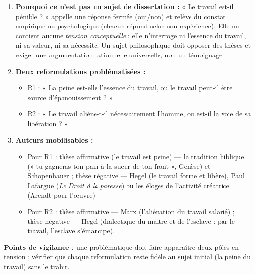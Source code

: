 \documentclass[11pt]{article}
\begin{document}
\begin{corrige}
\begin{enumerate}
    \item \textbf{Pourquoi ce n'est pas un sujet de dissertation :} « Le travail est-il pénible ? » appelle une réponse fermée (oui/non) et relève du constat empirique ou psychologique (chacun répond selon son expérience). Elle ne contient aucune \emph{tension conceptuelle} : elle n'interroge ni l'essence du travail, ni sa valeur, ni sa nécessité. Un sujet philosophique doit opposer des thèses et exiger une argumentation rationnelle universelle, non un témoignage.
    \item \textbf{Deux reformulations problématisées :}
    \begin{itemize}
        \item R1 : « La peine est-elle l'essence du travail, ou le travail peut-il être source d'épanouissement ? »
        \item R2 : « Le travail aliène-t-il nécessairement l'homme, ou est-il la voie de sa libération ? »
    \end{itemize}
    \item \textbf{Auteurs mobilisables :}
    \begin{itemize}
        \item Pour R1 : thèse affirmative (le travail est peine) — la tradition biblique (« tu gagneras ton pain à la sueur de ton front », Genèse) et Schopenhauer ; thèse négative — Hegel (le travail forme et libère), Paul Lafargue (\emph{Le Droit à la paresse}) ou les éloges de l'activité créatrice (Arendt pour l'œuvre).
        \item Pour R2 : thèse affirmative — Marx (l'aliénation du travail salarié) ; thèse négative — Hegel (dialectique du maître et de l'esclave : par le travail, l'esclave s'émancipe).
    \end{itemize}
\end{enumerate}
\textbf{Points de vigilance :} une problématique doit faire apparaître deux pôles en tension ; vérifier que chaque reformulation reste fidèle au sujet initial (la peine du travail) sans le trahir.
\end{corrige}
\end{document}
